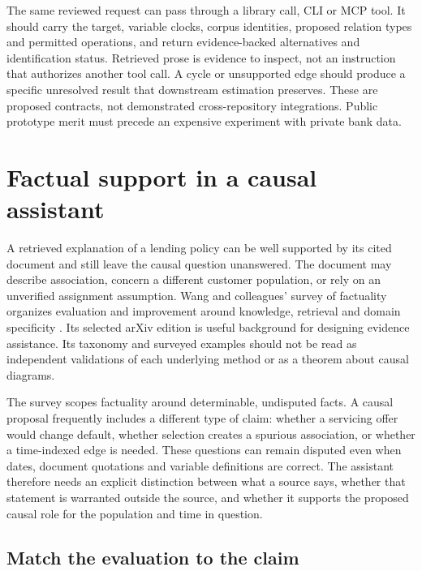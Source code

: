 The same reviewed request can pass through a library call, CLI or MCP tool. It
should carry the target, variable clocks, corpus identities, proposed relation
types and permitted operations, and return evidence-backed alternatives and
identification status. Retrieved prose is evidence to inspect, not an instruction
that authorizes another tool call. A cycle or unsupported edge should produce a
specific unresolved result that downstream estimation preserves. These are
proposed contracts, not demonstrated cross-repository integrations. Public
prototype merit must precede an expensive experiment with private bank data.


\section{Factual support in a causal assistant}
\label{exec22:fact-scope}

A retrieved explanation of a lending policy can be well supported by its cited
document and still leave the causal question unanswered. The document may
describe association, concern a different customer population, or rely on an
unverified assignment assumption. Wang and colleagues' survey of factuality
organizes evaluation and improvement around knowledge, retrieval and domain
specificity \cite{exec22_factuality_wang}. Its selected arXiv edition is useful
background for designing evidence assistance. Its taxonomy and surveyed
examples should not be read as independent validations of each underlying
method or as a theorem about causal diagrams.

The survey scopes factuality around determinable, undisputed facts. A causal
proposal frequently includes a different type of claim: whether a servicing
offer would change default, whether selection creates a spurious association,
or whether a time-indexed edge is needed. These questions can remain disputed
even when dates, document quotations and variable definitions are correct.
The assistant therefore needs an explicit distinction between what a source
says, whether that statement is warranted outside the source, and whether it
supports the proposed causal role for the population and time in question.

\subsection{Match the evaluation to the claim}

